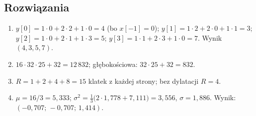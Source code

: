 \subsection*{Rozwiązania}
\begin{enumerate}
\item $y[0]=1\cdot0+2\cdot2+1\cdot0=4$ (bo $x[-1]=0$); $y[1]=1\cdot2+2\cdot0+1\cdot1=3$; $y[2]=1\cdot0+2\cdot1+1\cdot3=5$; $y[3]=1\cdot1+2\cdot3+1\cdot0=7$. Wynik $(4,3,5,7)$.
\item $16\cdot32\cdot25+32=12\,832$; głębokościowa: $32\cdot25+32=832$.
\item $R=1+2+4+8=15$ klatek z każdej strony; bez dylatacji $R=4$.
\item $\mu=16/3=5{,}333$; $\sigma^2=\frac13\big(2\cdot1{,}778+7{,}111\big)=3{,}556$, $\sigma=1{,}886$. Wynik: $(-0{,}707;\,-0{,}707;\,1{,}414)$.
\end{enumerate}
